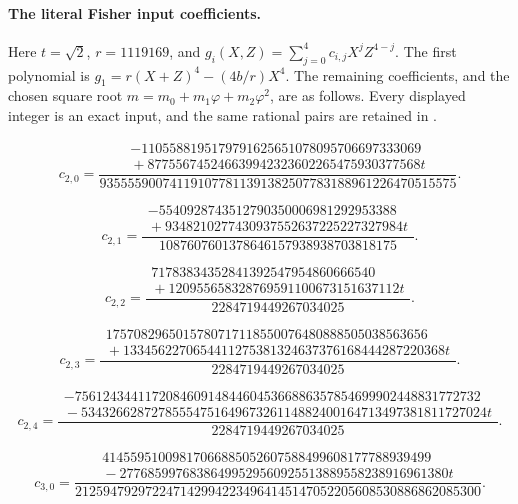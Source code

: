 \paragraph{The literal Fisher input coefficients.}
Here \(t=\sqrt2\), \(r=1119169\), and
\(g_i(X,Z)=\sum_{j=0}^4 c_{i,j}X^jZ^{4-j}\).
The first polynomial is
\(g_1=r(X+Z)^4-(4b/r)X^4\).
The remaining coefficients, and the chosen square root
\(m=m_0+m_1\varphi+m_2\varphi^2\), are as follows.
Every displayed integer is an exact input, and the same
rational pairs are retained in
.

\[
c_{2,0}=\frac{\begin{gathered}\scriptstyle -1105588195179791625651078095706697333069\\[-2pt]\scriptstyle {}+877556745246639942323602265475930377568t\end{gathered}}{935555900741191077811391382507783188961226470515575}.
\tag{A.154.D20}
\]

\[
c_{2,1}=\frac{\begin{gathered}\scriptstyle -5540928743512790350006981292953388\\[-2pt]\scriptstyle {}+9348210277430937552637225227327984t\end{gathered}}{1087607601378646157938938703818175}.
\tag{A.154.D21}
\]

\[
c_{2,2}=\frac{\begin{gathered}\scriptstyle 71783834352841392547954860666540\\[-2pt]\scriptstyle {}+120955658328769591100673151637112t\end{gathered}}{2284719449267034025}.
\tag{A.154.D22}
\]

\[
c_{2,3}=\frac{\begin{gathered}\scriptstyle 1757082965015780717118550076480888505038563656\\[-2pt]\scriptstyle {}+1334562270654411275381324637376168444287220368t\end{gathered}}{2284719449267034025}.
\tag{A.154.D23}
\]

\[
c_{2,4}=\frac{\begin{gathered}\scriptstyle -7561243441172084609148446045366886357854699902448831772732\\[-2pt]\scriptstyle {}-5343266287278555475164967326114882400164713497381811727024t\end{gathered}}{2284719449267034025}.
\tag{A.154.D24}
\]

\[
c_{3,0}=\frac{\begin{gathered}\scriptstyle 41455951009817066885052607588499608177788939499\\[-2pt]\scriptstyle {}-27768599768386499529560925513889558238916961380t\end{gathered}}{2125947929722471429942234964145147052205608530886862085300}.
\tag{A.154.D30}
\]

